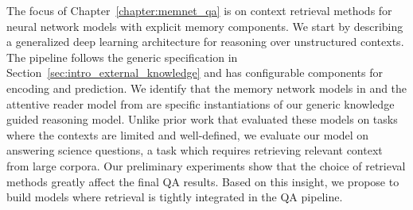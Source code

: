 The focus of Chapter~\ref{chapter:memnet_qa} is on context retrieval methods for neural network models with explicit memory components.
We start by describing a generalized deep learning architecture for reasoning over unstructured contexts. The pipeline follows the generic
specification in Section~\ref{sec:intro_external_knowledge} and has configurable components
for encoding and prediction. We identify that the memory network models in \cite{weston2014memory,Sukhbaatar2015EndToEndMN,Xiong2016DynamicMN}
and the attentive reader model from \cite{hermann2015teaching} are specific instantiations of our generic knowledge guided reasoning model.
Unlike prior work that evaluated these models on tasks where the contexts are limited and well-defined, we evaluate our model on answering science questions,
a task which requires retrieving relevant context from large corpora. Our preliminary experiments show that the choice of retrieval methods greatly affect the
final QA results. Based on this insight, we propose to build models where retrieval is tightly integrated in the QA pipeline.

